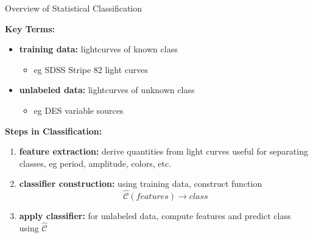 \documentclass[12pt]{beamer}
\begin{document}
\begin{frame}{Overview of Statistical Classification}

\textbf{Key Terms:}
\begin{itemize}
\item \textbf{training data:} lightcurves of known class
  \begin{itemize}
  \item eg SDSS Stripe 82 light curves
  \end{itemize}
\item \textbf{unlabeled data:} lightcurves of unknown class
  \begin{itemize}
  \item eg DES variable sources
  \end{itemize}
\end{itemize}

\vspace{.2in}

\textbf{Steps in Classification:}
\begin{enumerate}
\item \textbf{feature extraction:} derive quantities from light curves useful for separating classes, eg period, amplitude, colors, etc.
\item \textbf{classifier construction:} using training data, construct function
\begin{equation*}
\widehat{\mathcal{C}}(features) \rightarrow class
\end{equation*} 
\item \textbf{apply classifier:} for unlabeled data, compute features and predict class using $\widehat{\mathcal{C}}$
\end{enumerate}
\end{frame}
\end{document}
